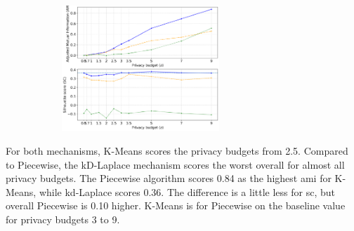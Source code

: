 \begin{figure}[H]
\begin{subfigure}{1\textwidth}
    \includegraphics[width=0.65\textwidth]{Results/kd-laplace/piecewise/circle-dataset/ami-and-sc_2_dimensions.png}
  \end{subfigure}
  \label{fig:validation-circle-dataset_comparison_2d-laplace}
\end{figure}
For both mechanisms, K-Means scores the privacy budgets from 2.5.
Compared to Piecewise, the kD-Laplace mechanism scores the worst overall for almost all privacy budgets.
The Piecewise algorithm scores 0.84 as the highest \gls{ami} for K-Means, while kd-Laplace scores 0.36.
The difference is a little less for \gls{sc}, but overall Piecewise is 0.10 higher.
K-Means is for Piecewise on the baseline value for privacy budgets 3 to 9.
\newpage
